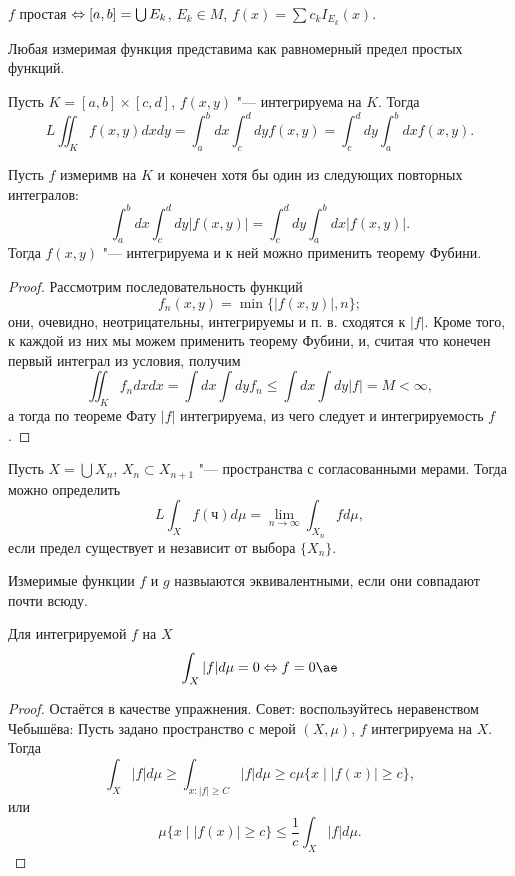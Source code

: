 \documentclass[main]{subfiles}
\begin{document}
\begin{exercise}
  $f$ простая $\Leftrightarrow [a, b] = \bigcup E_k$, $E_k \in M$,
  $f(x) = \sum c_k I_{E_k}(x)$.
\end{exercise}

\begin{exercise}
  Любая измеримая функция представима как равномерный предел
  простых функций.
\end{exercise}

\begin{theorem}[Фубини]
  Пусть $K = [a, b] \times [c, d]$, $f(x, y)$ "--- интегрируема на $K$.
  Тогда
  \[
    L \iint_K f(x, y) dx dy
    = \int_a^b dx \int_c^d dy f(x, y)
    = \int_c^d dy \int_a^b dx f(x, y).
  \]
\end{theorem}

\begin{corollary}
  Пусть $f$ измеримв на $K$ и конечен хотя бы
  один из следующих повторных интегралов:
  \[
    \int_a^b dx \int_c^d dy |f(x, y)|
    = \int_c^d dy \int_a^b dx |f(x, y)|.
  \]
  Тогда $f(x, y)$ "--- интегрируема
  и к ней можно применить теорему Фубини.
\end{corollary}
\begin{proof}
  Рассмотрим последовательность функций
  \[
    f_n(x, y) = \min \{ |f(x, y)|, n \};
  \]
  они, очевидно, неотрицательны, интегрируемы 
  и п. в. сходятся к $|f|$. Кроме того,
  к каждой из них мы можем применить теорему Фубини,
  и, считая что конечен первый интеграл из условия,
  получим
  \[
    \iint_K f_n dx dx =
    \int dx \int dy f_n \le \int dx \int dy |f| = M < \infty,
  \]
  а тогда по теореме Фату $|f|$ интегрируема,
  из чего следует и интегрируемость $f$.
\end{proof}

Пусть $X = \bigcup X_n$, $X_n \subset X_{n+1}$ "--- пространства с согласованными
мерами. Тогда можно определить
\[
  L\int_X f(ч) d\mu = \lim_{n \to \infty} \int_{X_n} f d\mu,
\]
если предел существует и независит от выбора $\{ X_n \}$.

\begin{definition}
  Измеримые функции $f$ и $g$ назвыаются
  эквивалентными, если они совпадают почти всюду.
\end{definition}

\begin{proposition}
  Для интегрируемой $f$ на $X$
  \[
    \int_X |f| d \mu = 0 \oTTo
    f = 0 \ae
  \]
\end{proposition}
\begin{proof}
  Остаётся в качестве упражнения.
  Совет: воспользуйтесь неравенством Чебышёва:
  Пусть задано пространство с мерой $(X, \mu)$,
  $f$ интегрируема на $X$. Тогда
  \[
    \int_X |f| d \mu \ge
    \int_{x : |f| \ge C} |f| d \mu
    \ge c \mu\{ x \mid |f(x)| \ge c \},
  \]
  или
  \[
    \mu\{ x \mid |f(x)| \ge c \}
    \le \frac1c \int_X |f| d\mu.
  \]
\end{proof}
\end{document}
